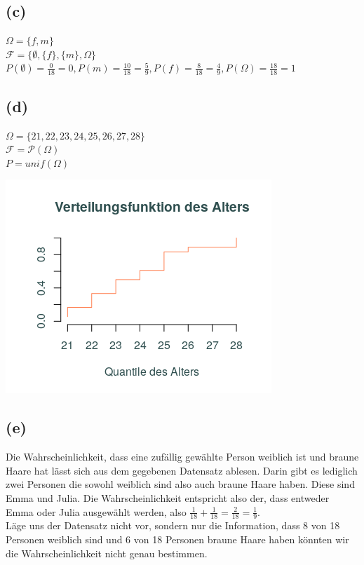\documentclass[a4paper]{scrartcl}
\begin{document}
\subsection*{(c)}
$\Omega = \lbrace f,m\rbrace$\\
$\mathcal{F} = \lbrace \emptyset, \lbrace f \rbrace, \lbrace m\rbrace, \Omega\rbrace$\\
$ P(\emptyset) = \frac{0}{18} = 0, P(m) = \frac{10}{18} = \frac{5}{9}, P(f) = \frac{8}{18} = \frac{4}{9}, P(\Omega) = \frac{18}{18} = 1$


\subsection*{(d)}
$\Omega = \lbrace21,22,23,24,25,26,27,28 \rbrace$\\
$\mathcal{F} = \mathcal{P}(\Omega)$\\
$ P=unif(\Omega)$

\begin{center}
	\includegraphics*[scale = 1]{alter_verteilungsfunktion.png}
\end{center}


\subsection*{(e)}
Die Wahrscheinlichkeit, dass eine zufällig gewählte Person weiblich ist und braune Haare hat lässt sich aus dem gegebenen Datensatz ablesen. Darin gibt es lediglich zwei Personen die sowohl weiblich sind also auch braune Haare haben. Diese sind Emma und Julia. Die Wahrscheinlichkeit entspricht also der, dass entweder Emma oder Julia ausgewählt werden, also $\frac{1}{18} + \frac{1}{18} = \frac{2}{18} = \frac{1}{9}$. \\
Läge uns der Datensatz nicht vor, sondern nur die Information, dass 8 von 18 Personen weiblich sind und 6 von 18 Personen braune Haare haben könnten wir die Wahrscheinlichkeit nicht genau bestimmen.
\end{document}
